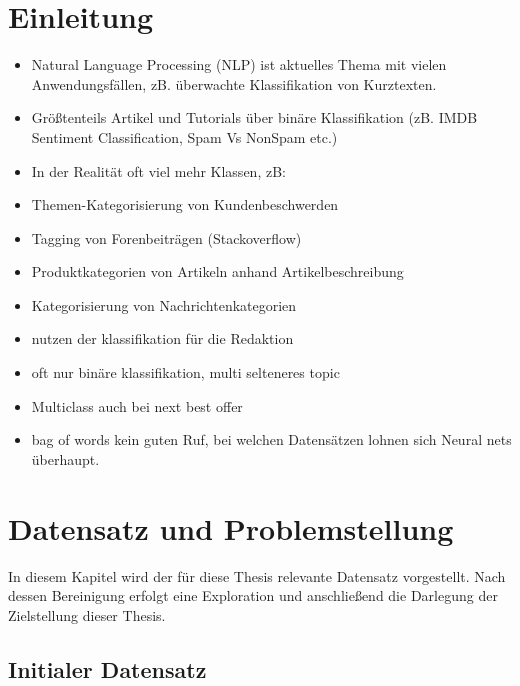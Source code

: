 \documentclass[a4paper,11pt]{article}
\begin{document}
\section{Einleitung}

\begin{itemize}
\item Natural Language Processing (NLP) ist aktuelles Thema mit vielen Anwendungsfällen, zB. überwachte Klassifikation von Kurztexten.
   \item Größtenteils Artikel und Tutorials über binäre Klassifikation (zB. IMDB Sentiment Classification, Spam Vs NonSpam etc.)
   \item In der Realität oft viel mehr Klassen, zB:
   \item Themen-Kategorisierung von Kundenbeschwerden
   \item Tagging von Forenbeiträgen (Stackoverflow)
   \item Produktkategorien von Artikeln anhand Artikelbeschreibung
   \item Kategorisierung von Nachrichtenkategorien
    \item nutzen der klassifikation für die Redaktion
    \item oft nur binäre klassifikation, multi selteneres topic
    \item Multiclass auch bei next best offer
    \item bag of words kein guten Ruf, bei welchen Datensätzen lohnen sich Neural nets überhaupt.
\end{itemize}{}



\section{Datensatz und Problemstellung}

In diesem Kapitel wird der für diese Thesis relevante Datensatz vorgestellt. Nach dessen Bereinigung erfolgt eine Exploration und anschließend die Darlegung der Zielstellung dieser Thesis.


\subsection{Initialer Datensatz}
\end{document}
